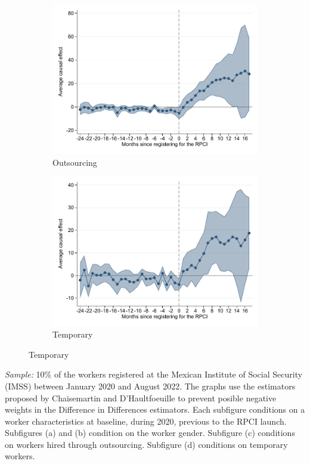 \documentclass[oneside,11pt]{article}
\begin{document}
\begin{figure}[H]
\begin{center}
    \begin{subfigure}{0.49\textwidth}
    \caption{Outsourcing}
    \includegraphics[width=\textwidth]{04_Figures/muestra_10porciento/event_study_sal_cierre_chaisemartin_outsourcing.pdf}
    \end{subfigure}
    \begin{subfigure}{0.49\textwidth}
    \caption{Temporary}
    \includegraphics[width=\textwidth]{04_Figures/muestra_10porciento/event_study_sal_cierre_chaisemartin_eventual.pdf}
    \end{subfigure}
    
    \end{center}
\end{figure}
\scriptsize{
\noindent \textit{Sample:} 10\% of the workers registered at the Mexican Institute of Social Security (IMSS) between January 2020 and August 2022. The graphs use the estimators proposed by Chaisemartin and D'Haultfoeuille to prevent posible negative weights in the Difference in Differences estimators. Each subfigure conditions on a worker characteristics at baseline, during 2020, previous to the RPCI launch. Subfigures (a) and (b) condition on the worker gender. Subfigure (c) conditions on workers hired through outsourcing. Subfigure (d) conditions on temporary workers.
}
\end{document}
